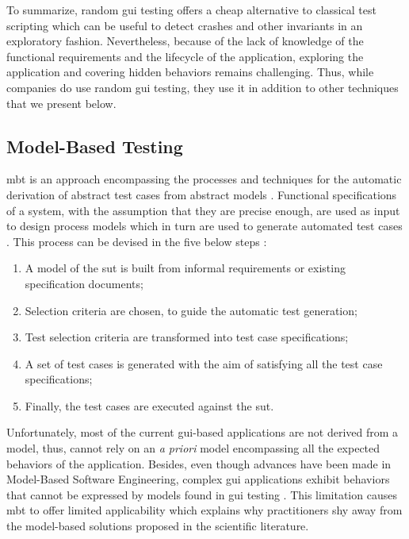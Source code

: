 To summarize, random \gls{gui} testing offers a cheap alternative to classical test scripting which can be useful to detect crashes and other invariants in an exploratory fashion. Nevertheless, because of the lack of knowledge of the functional requirements and the lifecycle of the application, exploring the application and covering hidden behaviors remains challenging. Thus, while companies do use random \gls{gui} testing, they use it in addition to other techniques that we present below.

\subsection{Model-Based Testing}
\label{sec:introduction-model-based-testing}

\gls{mbt} is an approach encompassing the processes and techniques for the automatic derivation of abstract test cases from abstract models \cite{Utting2012}. Functional specifications of a system, with the assumption that they are precise enough, are used as input to design process models which in turn are used to generate automated test cases \cite{Gupta2011}. This process can be devised in the five below steps \cite{Utting2012}:

\begin{enumerate}
    \item A model of the \gls{sut} is built from informal requirements or existing specification documents;
    \item Selection criteria are chosen, to guide the automatic test generation;
    \item Test selection criteria are transformed into test case specifications;
    \item A set of test cases is generated with the aim of satisfying all the test case specifications;
    \item Finally, the test cases are executed against the \gls{sut}.
\end{enumerate}

Unfortunately, most of the current \gls{gui}-based applications are not derived from a model, thus, cannot rely on an \emph{a priori} model encompassing all the expected behaviors of the application. Besides, even though advances have been made in Model-Based Software Engineering, complex \gls{gui} applications exhibit behaviors that cannot be expressed by models found in \gls{gui} testing \cite{Lelli2015}. This limitation causes \gls{mbt} to offer limited applicability which explains why practitioners shy away from the model-based solutions proposed in the scientific literature.

